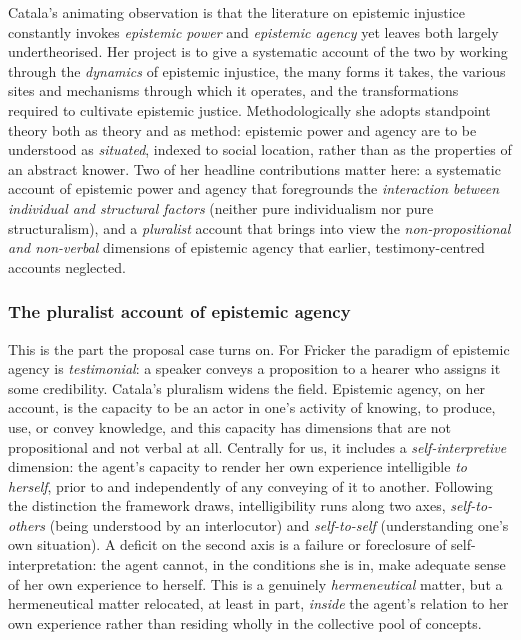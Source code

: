 Catala's animating observation is that the literature on epistemic injustice constantly invokes \emph{epistemic power} and \emph{epistemic agency} yet leaves both largely undertheorised. Her project is to give a systematic account of the two by working through the \emph{dynamics} of epistemic injustice, the many forms it takes, the various sites and mechanisms through which it operates, and the transformations required to cultivate epistemic justice. Methodologically she adopts standpoint theory both as theory and as method: epistemic power and agency are to be understood as \emph{situated}, indexed to social location, rather than as the properties of an abstract knower. Two of her headline contributions matter here: a systematic account of epistemic power and agency that foregrounds the \emph{interaction between individual and structural factors} (neither pure individualism nor pure structuralism), and a \emph{pluralist} account that brings into view the \emph{non-propositional and non-verbal} dimensions of epistemic agency that earlier, testimony-centred accounts neglected.

\subsubsection{The pluralist account of epistemic agency}

This is the part the proposal case turns on. For Fricker the paradigm of epistemic agency is \emph{testimonial}: a speaker conveys a proposition to a hearer who assigns it some credibility. Catala's pluralism widens the field. Epistemic agency, on her account, is the capacity to be an actor in one's activity of knowing, to produce, use, or convey knowledge, and this capacity has dimensions that are not propositional and not verbal at all. Centrally for us, it includes a \emph{self-interpretive} dimension: the agent's capacity to render her own experience intelligible \emph{to herself}, prior to and independently of any conveying of it to another. Following the distinction the framework draws, intelligibility runs along two axes, \emph{self-to-others} (being understood by an interlocutor) and \emph{self-to-self} (understanding one's own situation). A deficit on the second axis is a failure or foreclosure of self-interpretation: the agent cannot, in the conditions she is in, make adequate sense of her own experience to herself. This is a genuinely \emph{hermeneutical} matter, but a hermeneutical matter relocated, at least in part, \emph{inside} the agent's relation to her own experience rather than residing wholly in the collective pool of concepts.

